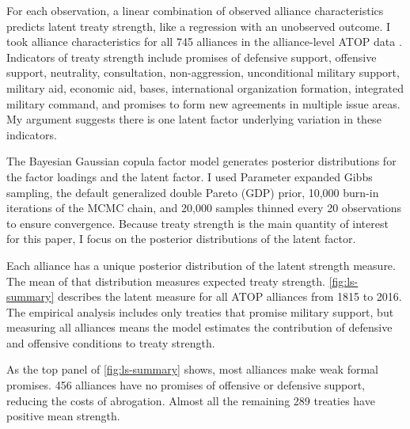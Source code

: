 \documentclass[12pt]{article}
\begin{document}
For each observation, a linear combination of observed alliance characteristics predicts latent treaty strength, like a regression with an unobserved outcome.  
I took alliance characteristics for all 745 alliances in the alliance-level ATOP data \citep{Leedsetal2002}. 
Indicators of treaty strength include promises of defensive support, offensive support, neutrality, consultation, non-aggression, unconditional military support, military aid, economic aid, bases, international organization formation, integrated military command, and promises to form new agreements in multiple issue areas. 
My argument suggests there is one latent factor underlying variation in these indicators.


The Bayesian Gaussian copula factor model generates posterior distributions for the factor loadings and the latent factor. 
I used Parameter expanded Gibbs sampling, the default generalized double Pareto (GDP) prior, 10,000 burn-in iterations of the MCMC chain, and 20,000 samples thinned every 20 observations to ensure convergence. 
Because treaty strength is the main quantity of interest for this paper, I focus on the posterior distributions of the latent factor. 


Each alliance has a unique posterior distribution of the latent strength measure. 
The mean of that distribution measures expected treaty strength. 
\autoref{fig:ls-summary} describes the latent measure for all ATOP alliances from 1815 to 2016.
The empirical analysis includes only treaties that promise military support, but measuring all alliances means the model estimates the contribution of defensive and offensive conditions to treaty strength. 


As the top panel of \autoref{fig:ls-summary} shows, most alliances make weak formal promises.
456 alliances have no promises of offensive or defensive support, reducing the costs of abrogation. 
Almost all the remaining 289 treaties have positive mean strength. 
\end{document}
